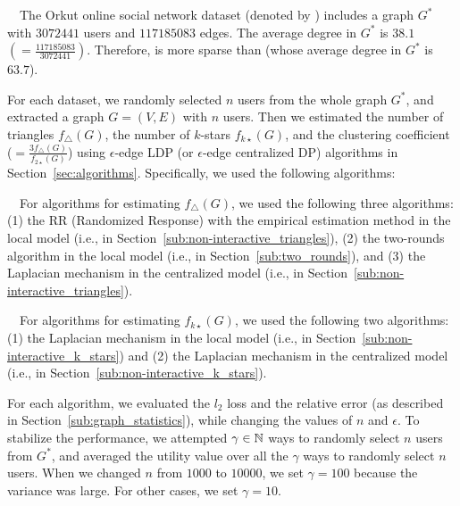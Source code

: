 \smallskip
{}~~The 
Orkut online social network dataset (denoted by \Orkut{})  \cite{snapnets} includes a graph $G^*$ with $3072441$ users and $117185083$ edges. 
The average degree in $G^*$ is $38.1$ $(=\frac{117185083}{3072441})$. 
Therefore, \Orkut{} is more sparse than \IMDB{} (whose average degree in $G^*$ is $63.7$). 

\smallskip
For each dataset, we randomly selected $n$ users from the whole graph $G^*$, and extracted a graph $G=(V,E)$ with 
$n$ users. 
Then we estimated the number of triangles $f_\triangle(G)$, the number of $k$-stars $f_{k\star}(G)$, and the clustering coefficient ($=\frac{3 f_\triangle(G)}{f_{2\star}(G)}$) using $\epsilon$-edge LDP (or $\epsilon$-edge centralized DP) algorithms in Section~\ref{sec:algorithms}. 
Specifically, we used the following algorithms:

\smallskip
{}~~For algorithms for estimating $f_\triangle(G)$, we used the following three algorithms: 
(1) the RR (Randomized Response) with the empirical estimation method in the local model (i.e.,  in Section~\ref{sub:non-interactive_triangles}), 
(2) the two-rounds algorithm in the local model (i.e.,  in Section~\ref{sub:two_rounds}), and 
(3) the Laplacian mechanism in the centralized model (i.e.,  in Section~\ref{sub:non-interactive_triangles}).

\smallskip
{}~~For algorithms for estimating $f_{k\star}(G)$, we used the following two algorithms: 
(1) the Laplacian mechanism in the local model (i.e.,  in Section~\ref{sub:non-interactive_k_stars}) and 
(2) the Laplacian mechanism in the centralized model (i.e.,  in Section~\ref{sub:non-interactive_k_stars}). 

\smallskip
For each algorithm, we evaluated the $l_2$ loss and the relative error (as described in Section~\ref{sub:graph_statistics}), while changing the values of $n$ and $\epsilon$. 
To stabilize the performance, we attempted $\gamma \in \mathbb{N}$ ways to randomly select $n$ users from $G^*$, and averaged the utility value over all the $\gamma$ ways to randomly select $n$ users. 
When we changed $n$ from $1000$ to $10000$, we set $\gamma = 100$ because the variance was large. For other cases, we set $\gamma = 10$. 

